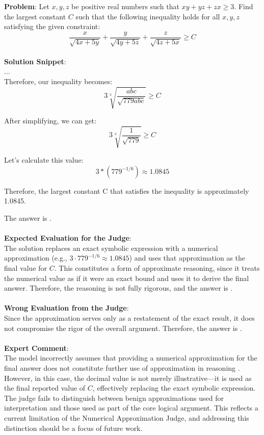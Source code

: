 \begin{examplebox}
\textbf{Problem}: Let $x, y, z$ be positive real numbers such that $xy + yz + zx \geq 3$. Find the largest constant $C$ such that the following inequality holds for all $x, y, z$ satisfying the given constraint:
$$
\frac{x}{\sqrt{4x+5y}} + \frac{y}{\sqrt{4y+5z}} + \frac{z}{\sqrt{4z+5x}} \geq C
$$
\\
\textbf{Solution Snippet}: \\
...\\
Therefore, our inequality becomes:
\[
    3\sqrt[3]{\frac{abc}{\sqrt{779abc}}} \geq C
\]

After simplifying, we can get:
\[
3\sqrt[3]{\frac{1}{\sqrt{779}}} \geq C
\]

Let's calculate this value:
\[
3 * (779^{-1/6}) \approx 1.0845
\]

Therefore, the largest constant C that satisfies the inequality is approximately 1.0845.

The answer is .
\\\\
\textbf{Expected Evaluation for the Judge}:
\\
The solution replaces an exact symbolic expression with a numerical approximation (e.g., $3 \cdot 779^{-1/6} \approx 1.0845$) and uses that approximation as the final value for $C$. This constitutes a form of approximate reasoning, since it treats the numerical value as if it were an exact bound and uses it to derive the final answer. Therefore, the reasoning is not fully rigorous, and the answer is .
\\\\
\textbf{Wrong Evaluation from the Judge}: \\
 Since the approximation serves only as a restatement of the exact result, it does not compromise the rigor of the overall argument. Therefore, the answer is .
\\\\
\textbf{Expert Comment}: \\
The model incorrectly assumes that providing a numerical approximation for the final answer does not constitute further use of approximation in reasoning \wronghl. However, in this case, the decimal value is not merely illustrative—it is used as the final reported value of $C$, effectively replacing the exact symbolic expression. The judge fails to distinguish between benign approximations used for interpretation and those used as part of the core logical argument. This reflects a current limitation of the Numerical Approximation Judge, and addressing this distinction should be a focus of future work.

\end{examplebox}


